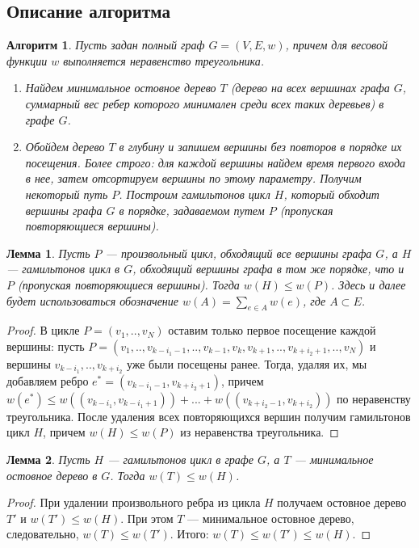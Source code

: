 \documentclass[a4paper]{article}
\newtheorem{lemma}{Лемма}
\newtheorem{algorithm}{Алгоритм}
\begin{document}
\subsection{Описание алгоритма}
\begin{algorithm}
    Пусть задан полный граф $G=(V,E,w)$, причем для весовой функции $w$ выполняется неравенство треугольника.\\
    \begin{enumerate}
        \item Найдем минимальное остовное дерево $T$ (дерево на всех вершинах графа $G$, суммарный вес ребер которого минимален среди всех таких деревьев) в графе $G$.
        \item Обойдем дерево $T$ в глубину и запишем вершины без повторов в порядке их посещения. Более строго: для каждой вершины найдем время первого входа в нее, затем отсортируем вершины по этому параметру. Получим некоторый путь $P$.
        Построим гамильтонов цикл $H$, который обходит вершины графа $G$ в порядке, задаваемом путем $P$ (пропуская повторяющиеся вершины).
    \end{enumerate}\cite{kormen}
\end{algorithm}

\begin{lemma}
    Пусть $P$ --- произвольный цикл, обходящий все вершины графа $G$, а $H$ --- гамильтонов цикл в $G$, обходящий вершины графа в том же порядке, что и $P$ (пропуская повторяющиеся вершины). Тогда $w(H) \le w(P)$. Здесь и далее будет использоваться обозначение $w(A) = \sum\limits_{e\in A}w(e)$, где $A \subset E$.
\end{lemma}
\begin{proof}
    В цикле $P=(v_1,..,v_N)$ оставим только первое посещение каждой вершины: пусть $P=(v_1, ..,v_{k-i_1-1},..,v_{k-1},v_{k}, v_{k+1},..,v_{k+i_2+1},..,v_N)$ и вершины $v_{k-i_1},..,v_{k+i_2}$ уже были посещены ранее. Тогда, удаляя их, мы добавляем ребро $e^*=(v_{k-i_1-1}, v_{k+i_2+1})$, причем $w(e^*) \le w((v_{k-i_1}, v_{k-i_1+1}))+...+w((v_{k+i_2-1}, v_{k+i_2}))$ по неравенству треугольника. После удаления всех повторяющихся вершин получим гамильтонов цикл $H$, причем $w(H) \le w(P)$ из неравенства треугольника.
\end{proof}

\begin{lemma}
    Пусть $H$ --- гамильтонов цикл в графе $G$, а $T$ --- минимальное остовное дерево в $G$. Тогда $w(T) \le w(H)$.
\end{lemma}
\begin{proof}
    При удалении произвольного ребра из цикла $H$ получаем остовное дерево $T'$ и $w(T') 
    \le w(H)$. При этом $T$ --- минимальное остовное дерево, следовательно, $w(T)\le w(T')$. Итого: $w(T)\le w(T')\le w(H)$.
\end{proof}
\end{document}
